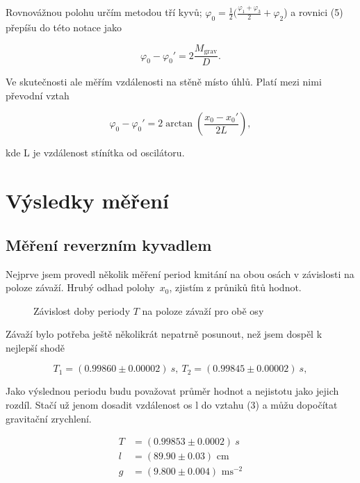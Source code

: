 \documentclass[a4paper,11pt]{article}
\begin{document}
\newpage

Rovnovážnou polohu určím metodou tří kyvů; $\varphi_0 = \frac{1}{2}(\frac{\varphi_1 + \varphi_3}{2} + \varphi_2$) a rovnici (5) přepíšu do této notace jako

\begin{equation}
\varphi_0 - \varphi_0' = 2 \frac{M_{\text{grav}}}{D}.
\end{equation}

Ve skutečnosti ale měřím vzdálenosti na stěně místo úhlů. Platí mezi nimi převodní vztah

\begin{equation}
\varphi_0 - \varphi_0' = 2\arctan(\frac{x_0 - x_0'}{2L}),
\end{equation}

\noindent
kde L je vzdálenost stínítka od oscilátoru.

\section{Výsledky měření}

\subsection{Měření reverzním kyvadlem}
Nejprve jsem provedl několik měření period kmitání na obou osách v závislosti na poloze závaží. Hrubý odhad polohy~$x_0$, zjistím z průniků fitů hodnot.

\begin{figure}[htpb]
  \centering
  
  \caption{Závislost doby periody $T$ na poloze závaží pro obě osy}
\end{figure}

Závaží bylo potřeba ještě několikrát nepatrně posunout, než jsem dospěl k nejlepší shodě

\begin{equation}
T_1 = (0.99860 \pm 0.00002)\ s,\ T_2 = (0.99845 \pm 0.00002)\ s,
\end{equation}

Jako výslednou periodu budu považovat průměr hodnot a nejistotu jako jejich rozdíl. Stačí už jenom dosadit vzdálenost os l do vztahu (3) a můžu dopočítat gravitační zrychlení. 

\begin{align}
  T &= (0.99853 \pm 0.0002) \ s \\
  l &= (89.90 \pm 0.03) \text{ cm} \\
  g &= (9.800 \pm 0.004) \text{ ms}^{-2}
\end{align}
\end{document}
